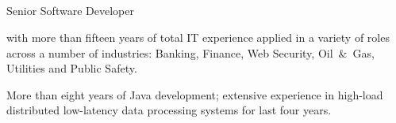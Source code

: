 \documentclass{res}
\newcommand{\osection}[1]{\section{\sc {\Large \textbf{#1}\\}} \vspace{0.30cm}}
\newif\ifFullVersion
\begin{document}
\begin{resume}

\osection{Summary}
\ifFullVersion
\noindent Team Lead / Principal Software Developer
\else
\noindent Senior Software Developer
\fi
with more than fifteen years of total IT experience applied in a variety of roles across a number of industries: Banking, Finance, Web Security, Oil~\&~Gas, Utilities and Public Safety.
\ifFullVersion
Strong engineering background, working knowledge and proven skills in all stages of the software development life-cycle. More than 5~years of team leading experience, ability to interact well at all levels and articulate the IT-specific issues to non-IT colleagues in a clear business-transparent way.\\
\indent Looking for a challenging role where my skills and qualifications will add value and make a significant contribution to the company.
\else
More than eight years of Java development; extensive experience in high-load distributed low-latency data processing systems for last four years.
\fi


\end{resume}
\end{document}
